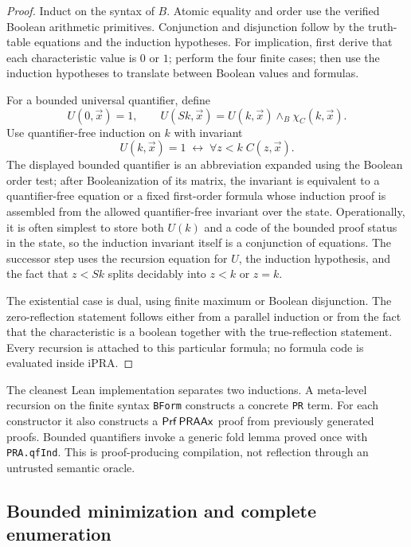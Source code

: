 \begin{proof}
Induct on the syntax of \(B\).  Atomic equality and order use the verified Boolean arithmetic primitives.
Conjunction and disjunction follow by the truth-table equations and the induction hypotheses.  For
implication, first derive that each characteristic value is \(0\) or \(1\); perform the four finite cases;
then use the induction hypotheses to translate between Boolean values and formulas.

For a bounded universal quantifier, define
\[
  U(0,\vec x)=1,
  \qquad
  U(Sk,\vec x)=U(k,\vec x)\wedge_B\chi_C(k,\vec x).
\]
Use quantifier-free induction on \(k\) with invariant
\[
  U(k,\vec x)=1\;\leftrightarrow\;\forall z<k\;C(z,\vec x).
\]
The displayed bounded quantifier is an abbreviation expanded using the Boolean order test; after
Booleanization of its matrix, the invariant is equivalent to a quantifier-free equation or a fixed
first-order formula whose induction proof is assembled from the allowed quantifier-free invariant over the
state.  Operationally, it is often simplest to store both \(U(k)\) and a code of the bounded proof status in
the state, so the induction invariant itself is a conjunction of equations.  The successor step uses the
recursion equation for \(U\), the induction hypothesis, and the fact that
\(z<Sk\) splits decidably into \(z<k\) or \(z=k\).

The existential case is dual, using finite maximum or Boolean disjunction.  The zero-reflection statement
follows either from a parallel induction or from the fact that the characteristic is a boolean together
with the true-reflection statement.  Every recursion is attached to this particular formula; no formula
code is evaluated inside iPRA.
\end{proof}

\begin{remark}
The cleanest Lean implementation separates two inductions.  A meta-level recursion on the finite syntax
\texttt{BForm} constructs a concrete \texttt{PR} term.  For each constructor it also constructs a
\(\mathsf{Prf}\,\mathsf{PRAAx}\) proof from previously generated proofs.  Bounded quantifiers invoke a generic fold lemma
proved once with \texttt{PRA.qfInd}.  This is proof-producing compilation, not reflection through an
untrusted semantic oracle.
\end{remark}

\subsection{Bounded minimization and complete enumeration}

